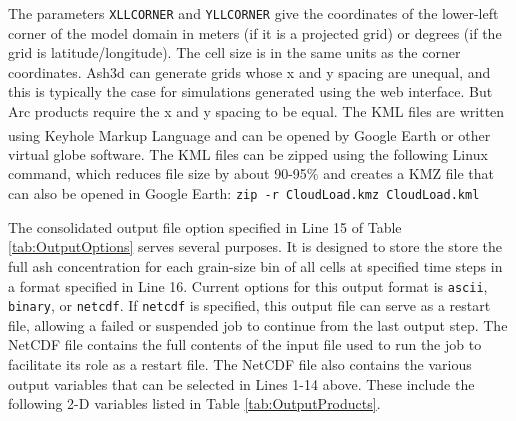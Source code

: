 The parameters \texttt{XLLCORNER} and \texttt{YLLCORNER} give the coordinates
of the lower-left
corner of the model domain in meters (if it is a projected grid) or degrees (if
the grid is latitude/longitude). The cell size is in the same units as the corner
coordinates. 
Ash3d can generate grids whose x and y spacing are unequal, and this is
typically the case for simulations generated using the web interface. But Arc
products require the x and y spacing to be equal.
The KML files are written using Keyhole Markup Language and can be opened by
Google Earth\textsuperscript{\tiny\textregistered} or other virtual globe
software. The KML files can be zipped using the
following Linux command, which reduces file size by about 90-95\% and creates a
KMZ file that can also be opened in Google Earth:
\texttt{zip -r CloudLoad.kmz CloudLoad.kml}

The consolidated output file option specified in Line 15 of Table \ref{tab:OutputOptions}
serves several purposes. It is designed to store the store the full ash concentration
for each grain-size bin
of all cells at specified time steps in a format specified in Line 16. Current options
for this output format is \texttt{ascii}, \texttt{binary}, or \texttt{netcdf}.
If \texttt{netcdf}
is specified, this output file can serve as a restart file, allowing a failed or
suspended job to continue from the last output step. The NetCDF file contains
the full contents of the input file used to run the job to facilitate its
role as a restart file.
The NetCDF file also contains the various output variables that can be selected
in Lines 1-14 above. These include the following 2-D variables listed in
Table \ref{tab:OutputProducts}.

